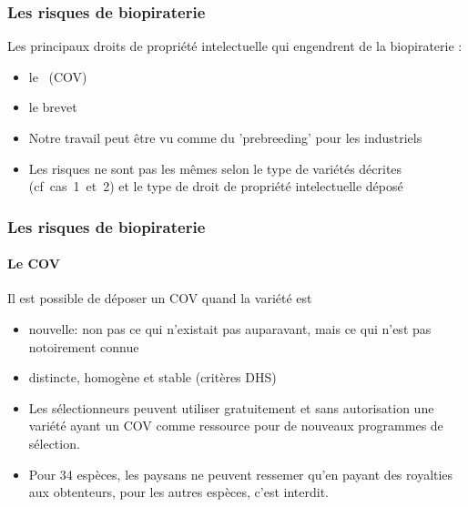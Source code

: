 \begin{frame} 
\frametitle{Les risques de biopiraterie}

Les principaux droits de propriété intelectuelle qui engendrent de la biopiraterie :
\begin{itemize}
\item le \COV~(COV)
\item le brevet
\end{itemize}

\vfill

\begin{block}{}
\begin{itemize}
\item Notre travail peut être vu comme du 'prebreeding' pour les industriels
\item Les risques ne sont pas les mêmes selon le type de variétés décrites (cf~cas~1~et~2) et le type de droit de propriété intelectuelle déposé
\end{itemize}
\end{block}

\end{frame}

\begin{frame} 
\frametitle{Les risques de biopiraterie}
\framesubtitle{Le COV}

Il est possible de déposer un COV quand la variété est 

\begin{itemize}
\item nouvelle: non pas ce qui n'existait pas auparavant, mais ce qui n'est pas notoirement connue
\item distincte, homogène et stable (critères DHS) 
\end{itemize}

\vfil


\begin{itemize}
\item Les sélectionneurs peuvent utiliser gratuitement et sans autorisation une variété ayant un COV comme ressource pour de nouveaux programmes de sélection. 
\item Pour 34 espèces, les paysans ne peuvent ressemer qu'en payant des royalties aux obtenteurs, pour les
autres espèces, c'est interdit.
\end{itemize}


\end{frame}


